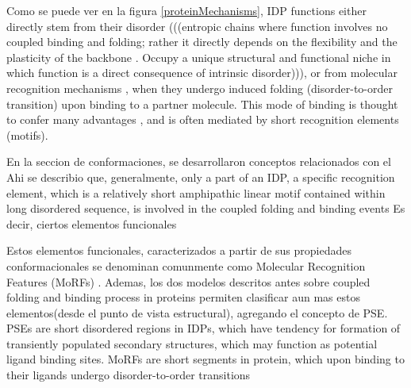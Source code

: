 Como se puede ver en la figura \ref{proteinMechanisms}, IDP functions either directly stem from their disorder (((entropic chains where function involves no coupled binding and folding;
rather it directly depends on the flexibility and the plasticity of the backbone . Occupy a unique structural and functional niche in which function is a direct consequence of intrinsic disorder))), 
or from molecular recognition mechanisms , when they undergo induced folding (disorder-to-order transition) upon binding to a partner molecule. %
This mode of binding is thought to confer many advantages \cite{gunasekaran2003extended,dyson2005intrinsically}%
, and is often mediated by short recognition elements (motifs)\cite{neduva2005systematic,fuxreiter2007local,davey2012attributes}.



En la seccion de conformaciones, se desarrollaron conceptos relacionados con el 
Ahi se describio que, generalmente, only a part of an IDP, a specific recognition element, which is a relatively short amphipathic linear motif contained within long disordered sequence, is involved in the coupled folding and binding events
Es decir, ciertos elementos funcionales 



Estos elementos funcionales, caracterizados a partir de sus propiedades conformacionales se denominan comunmente como Molecular Recognition Features (MoRFs)
\cite{mohan2006analysis,vacic2007characterization,oldfield2005coupled}.
Ademas, los dos modelos descritos antes sobre coupled folding and binding process in proteins permiten clasificar aun mas estos elementos(desde el punto de vista estructural), agregando el concepto de 
PSE\cite{fuxreiter2004preformed}.
PSEs are short disordered regions in IDPs, which have tendency for formation of transiently populated secondary structures, which may function as potential ligand binding sites. 
MoRFs are short segments in protein, which upon binding to their ligands undergo disorder-to-order transitions


